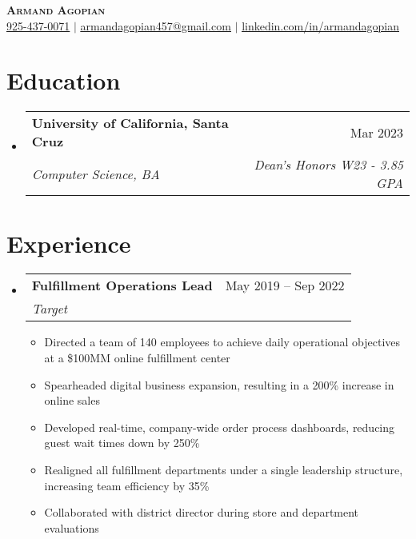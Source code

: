 \documentclass[letterpaper,11pt]{article}
\makeatletter
\newcommand{\resumeItem}[1]{
  \item\small{
    {#1 \vspace{-2pt}}
  }
}
\newcommand{\resumeSubheading}[4]{
  \vspace{-2pt}\item
    \begin{tabular*}{0.97\textwidth}[t]{l@{\extracolsep{\fill}}r}
      \textbf{#1} & #2 \\
      \textit{\small#3} & \textit{\small #4} \\
    \end{tabular*}\vspace{-7pt}
}
\newcommand{\resumeSubSubheading}[2]{
    \item
    \begin{tabular*}{0.97\textwidth}{l@{\extracolsep{\fill}}r}
      \textit{\small#1} & \textit{\small #2} \\
    \end{tabular*}\vspace{-7pt}
}
\newcommand{\resumeSubHeadingListStart}{\begin{itemize}[leftmargin=0.15in, label={}]}
\newcommand{\resumeSubHeadingListEnd}{\end{itemize}}
\newcommand{\resumeItemListStart}{\begin{itemize}}
\newcommand{\resumeItemListEnd}{\end{itemize}\vspace{-5pt}}
\makeatother
\begin{document}

\begin{center}
	\textbf{\Huge \scshape Armand Agopian} \\ \vspace{1pt}
	\small \href{tel:+19254370071}{925-437-0071} $|$
	\href{mailto:armandagopian457@gmail.com}{\underline{armandagopian457@gmail.com}} $|$
	\href{https://linkedin.com/in/armandagopian}{\underline{linkedin.com/in/armandagopian}}
\end{center}

\vspace{-0.8cm}
\section{Education}
\resumeSubHeadingListStart
\resumeSubheading
{University of California, Santa Cruz}{Mar 2023}
{Computer Science, BA}{Dean's Honors W23 - 3.85 GPA}
\resumeSubHeadingListEnd

\section{Experience}
\resumeSubHeadingListStart
\resumeSubheading
{Fulfillment Operations Lead}{May 2019 -- Sep 2022}
{Target}{}
\resumeItemListStart
\resumeItem{Directed a team of 140 employees to achieve daily operational objectives at a \$100MM online fulfillment center}
\resumeItem{Spearheaded digital business expansion, resulting in a 200\% increase in online sales}
\resumeItem{Developed real-time, company-wide order process dashboards, reducing guest wait times down by 250\%}
\resumeItem{Realigned all fulfillment departments under a single leadership structure, increasing team efficiency by 35\%}
\resumeItem{Collaborated with district director during store and department evaluations}
\resumeItemListEnd

\resumeSubHeadingListEnd
\end{document}
